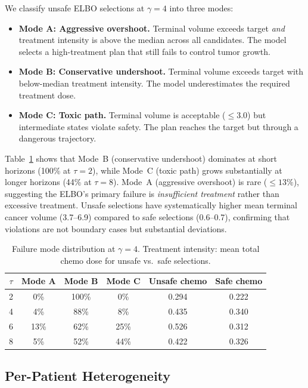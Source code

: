 \documentclass{article}
\begin{document}
We classify unsafe ELBO selections at $\gamma{=}4$ into three modes:
\begin{itemize}
    \item \textbf{Mode A: Aggressive overshoot.} Terminal volume exceeds target \emph{and} treatment intensity is above the median across all candidates. The model selects a high-treatment plan that still fails to control tumor growth.
    \item \textbf{Mode B: Conservative undershoot.} Terminal volume exceeds target with below-median treatment intensity. The model underestimates the required treatment dose.
    \item \textbf{Mode C: Toxic path.} Terminal volume is acceptable ($\leq 3.0$) but intermediate states violate safety. The plan reaches the target but through a dangerous trajectory.
\end{itemize}

Table~\ref{tab:failure_modes} shows that Mode~B (conservative undershoot) dominates at short horizons (100\% at $\tau{=}2$), while Mode~C (toxic path) grows substantially at longer horizons (44\% at $\tau{=}8$). Mode~A (aggressive overshoot) is rare ($\leq 13\%$), suggesting the ELBO's primary failure is \emph{insufficient treatment} rather than excessive treatment. Unsafe selections have systematically higher mean terminal cancer volume (3.7--6.9) compared to safe selections (0.6--0.7), confirming that violations are not boundary cases but substantial deviations.

\begin{table}[h]
\centering
\caption{Failure mode distribution at $\gamma{=}4$. Treatment intensity: mean total chemo dose for unsafe vs.\ safe selections.}
\label{tab:failure_modes}
\small
\begin{tabular}{c ccc cc}
\toprule
$\tau$ & Mode A & Mode B & Mode C & Unsafe chemo & Safe chemo \\
\midrule
2 & 0\% & 100\% & 0\% & 0.294 & 0.222 \\
4 & 4\% & 88\% & 8\% & 0.435 & 0.340 \\
6 & 13\% & 62\% & 25\% & 0.526 & 0.312 \\
8 & 5\% & 52\% & 44\% & 0.422 & 0.326 \\
\bottomrule
\end{tabular}
\end{table}

\subsection{Per-Patient Heterogeneity}
\end{document}
